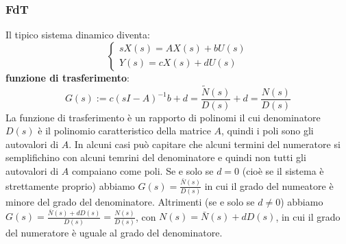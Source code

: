 \begin{landscape}
\begin{multicols*}{3}
    \subsubsection*{FdT}
    Il tipico sistema dinamico diventa:
    \[
        \begin{cases}
            s X(s) = AX(s) + b U(s)\\
            Y(s) = cX(s) + d U(s)
        \end{cases}
    \]
    \textbf{funzione di trasferimento}:
    \[
        G(s) := c(sI-A)^{-1} b + d = \frac{\tilde{N}(s)}{D(s)} + d = \frac{N(s)}{D(s)}
    \]
    La funzione di trasferimento è un rapporto di polinomi il cui denominatore $D(s)$ è il polinomio caratteristico della matrice $A$, quindi i poli sono gli autovalori di $A$. In alcuni casi può capitare che alcuni termini del numeratore si semplifichino con alcuni temrini del denominatore e quindi non tutti gli autovalori di $A$ compaiano come poli.\newline
    Se e solo se $d=0$ (cioè se il sistema è strettamente proprio) abbiamo $G(s) = \frac{\bar{N}(s)}{D(s)}$ in cui il grado del numeatore è minore del grado del denominatore.\newline
    Altrimenti (se e solo se $d\neq 0$) abbiamo $G(s) = \frac{\bar{N}(s) + dD(s)}{D(s)} = \frac{N(s)}{D(s)}$, con $N(s) = \bar{N}(s) +dD(s)$, in cui il grado del numeratore è uguale al grado del denominatore.
    \end{multicols*}
\end{landscape}